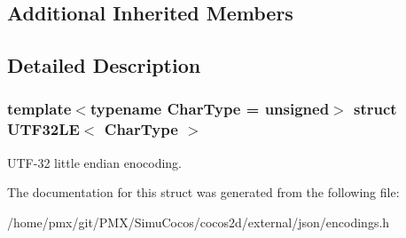 \subsection*{Additional Inherited Members}


\subsection{Detailed Description}
\subsubsection*{template$<$typename Char\+Type = unsigned$>$\newline
struct U\+T\+F32\+L\+E$<$ Char\+Type $>$}

U\+T\+F-\/32 little endian enocoding. 

The documentation for this struct was generated from the following file\+:\begin{DoxyCompactItemize}
\item 
/home/pmx/git/\+P\+M\+X/\+Simu\+Cocos/cocos2d/external/json/encodings.\+h\end{DoxyCompactItemize}
